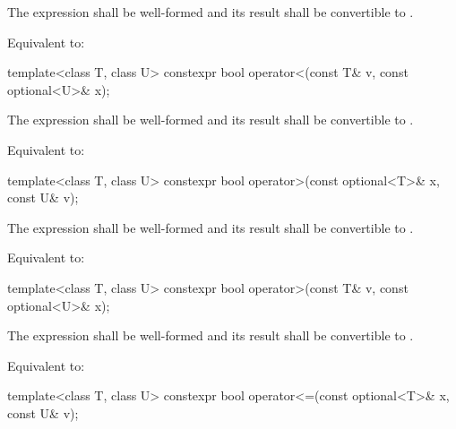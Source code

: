 \begin{itemdescr}
\pnum
\requires
The expression  shall be well-formed and
its result shall be convertible to .

\pnum
\effects
Equivalent to: 
\end{itemdescr}

%
\begin{itemdecl}
template<class T, class U> constexpr bool operator<(const T& v, const optional<U>& x);
\end{itemdecl}

\begin{itemdescr}
\pnum
\requires
The expression  shall be well-formed and
its result shall be convertible to .

\pnum
\effects
Equivalent to: 
\end{itemdescr}

%
\begin{itemdecl}
template<class T, class U> constexpr bool operator>(const optional<T>& x, const U& v);
\end{itemdecl}

\begin{itemdescr}
\pnum
\requires
The expression  shall be well-formed and
its result shall be convertible to .

\pnum
\effects
Equivalent to: 
\end{itemdescr}

%
\begin{itemdecl}
template<class T, class U> constexpr bool operator>(const T& v, const optional<U>& x);
\end{itemdecl}

\begin{itemdescr}
\pnum
\requires
The expression  shall be well-formed and
its result shall be convertible to .

\pnum
\effects
Equivalent to: 
\end{itemdescr}

%
\begin{itemdecl}
template<class T, class U> constexpr bool operator<=(const optional<T>& x, const U& v);
\end{itemdecl}

